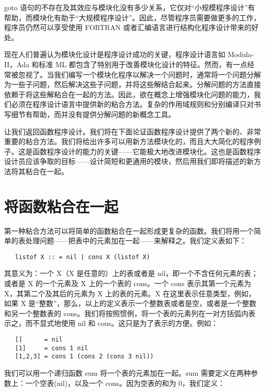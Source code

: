 \documentclass[12pt,a4paper]{article}
\begin{document}
goto 语句的不存在及其效应与模块化没有多少关系，它仅对``小规模程序设计''有帮助，而模块化有助于``大规模程序设计''。因此，尽管程序员需要做更多的工作，程序员仍然可以享受使用 FORTRAN 或者汇编语言进行结构化程序设计带来的好处。

现在人们普遍认为模块化设计是程序设计成功的关键，程序设计语言如 Modula-II\cite[Wir82]{Wir82}，Ada\cite[oD80]{oD80} 和标准 ML 都包含了特别用于改善模块化设计的特征。然而，有一点经常被忽视了。当我们编写一个模块化程序以解决一个问题时，通常将一个问题分解为一些子问题，然后解决这些子问题，并将这些解结合起来。分解问题的方法直接依赖于将这些解粘合在一起的方法。因此，欲在概念上增强模块化问题的能力，我们必须在程序设计语言中提供新的粘合方法。复杂的作用域规则和分别编译只对书写细节有帮助，而并没有提供分解问题的新概念工具。

让我们返回函数程序设计。我们将在下面论证函数程序设计提供了两个新的、非常重要的粘合方法。我们将给出许多可以用新方法模块化的，而且大大简化的程序例子。这是函数程序设计的能力的关键——它能极大地改进模块化。这也是函数程序设计员应该争取的目标——设计简短和更通用的模块，然后用我们即将描述的新方法将其粘合在一起。

\section{将函数粘合在一起}

第一种粘合方法可以将简单的函数粘合在一起形成更复杂的函数。我们将用一个简单的表处理问题——把表中的元素加在一起——来解释之。我们定义表如下：

\begin{verbatim}
   listof X :: = nil | cons X (listof X)
\end{verbatim}

其意义为：一个 X（X 是任意的）上的表或者是 nil，即一个不含任何元素的表；或者是 X 的一个元素及 X 上的一个表的 cons。一个 cons 表示其第一个元素为 X，其第二个及其后的元素为 X 上的表的元素。X 在这里表示任意类型，例如，如果 X 是``整数''，那么，以上的定义表示一个整数表或者是空，或者是一个整数和另一个整数表的 cons。我们将按照惯例，将一个表的元素列在一对方括弧内表示之，而不显式地使用 nil 和 cons。这只是为了表示的方便。例如：

\begin{verbatim}
   []      = nil
   [1]     = cons 1 nil
   [1,2,3] = cons 1 (cons 2 (cons 3 nil))
\end{verbatim}

我们可以用一个递归函数 sum 将一个表的元素加在一起。sum 需要定义在两种参数上：一个空表(nil)，以及一个 cons。因为空表的和为 0，我们定义：
\end{document}
